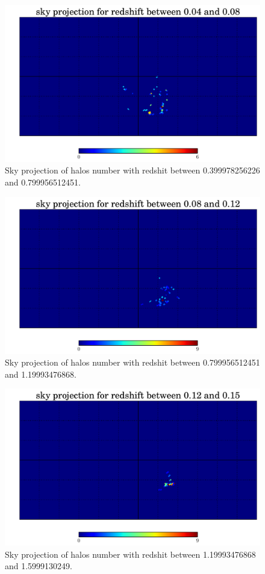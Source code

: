 \documentclass[12pt]{article}
\begin{document}
\begin{figure}
  \centering
  \includegraphics[width=12cm]{./Output/plots/HEALPix/sky_projection_HEALPix_Count_32_2.pdf}
  \caption{Sky projection of halos number with redshit between 0.399978256226 and 0.799956512451.}
  \label{fig:S-ProjCount-2}
\end{figure}


\begin{figure}
  \centering
  \includegraphics[width=12cm]{./Output/plots/HEALPix/sky_projection_HEALPix_Count_32_3.pdf}
  \caption{Sky projection of halos number with redshit between 0.799956512451 and 1.19993476868.}
  \label{fig:S-ProjCount-3}
\end{figure}


\begin{figure}
  \centering
  \includegraphics[width=12cm]{./Output/plots/HEALPix/sky_projection_HEALPix_Count_32_4.pdf}
  \caption{Sky projection of halos number with redshit between 1.19993476868 and 1.5999130249.}
  \label{fig:S-ProjCount-4}
\end{figure}
\end{document}
